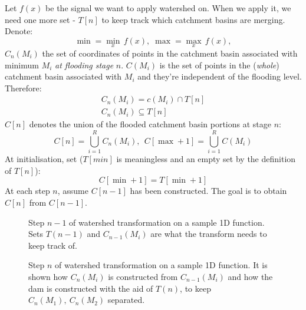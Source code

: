 \documentclass[a4paper]{article}
\begin{document}
Let $f(x)$ be the signal we want to apply watershed on. When we apply it, we need one more set - $T[n]$ to keep track which catchment basins are merging. Denote:
\[
\min = \underset{x}{\mathop{\min }}\,f\left( x \right), \;
\max = \underset{x}{\mathop{\max }}\,f\left( x \right),
\]
 $C_n(M_i)$ the set of coordinates of points in the catchment
basin associated with minimum $M_i$ \textit{at flooding stage} $n$. $C(M_i)$ is the set of points in the (\textit{whole}) catchment basin associated with $M_i$ and they're independent of the flooding level. Therefore:
\[
\begin{gathered}
C_n(M_i) = c(M_i) \cap T[n] \\
C_n(M_i) \subseteq T[n]
\end{gathered}
\]
$C[n]$ denotes the union of the
flooded catchment basin portions at
stage $n$:
\[
C\left[ n \right]=\bigcup\limits_{i=1}^{R}{{{C}_{n}}\left( {{M}_{i}} \right)},\ \ C\left[ \max +1 \right]=\bigcup\limits_{i=1}^{R}{C\left( {{M}_{i}} \right)}
\]
At initialisation, set ($T[min]$ is meaningless and an empty set by the definition of $T[n]$):
\[
C[\min+1] = T[\min+1]
\]
At each step $n$, assume $C[n-1]$ has
been constructed. The goal is to
obtain $C[n]$ from $C[n-1]$.

\begin{multicols}{2}
    \begin{figure}[H]
    \centering
    
    \captionsetup{width=0.33\textwidth}
    \caption{Step $n-1$ of watershed transformation on a sample 1D function. Sets $T(n-1)$ and $C_{n-1}(M_i)$ are what the transform needs to keep track of.}
    \end{figure}
    
    \columnbreak
    \begin{figure}[H]
    \centering
    
    \captionsetup{width=0.33\textwidth}
    \caption{Step $n$ of watershed transformation on a sample 1D function. It is shown how $C_n(M_i)$ is constructed from $C_{n-1}(M_i)$ and how the dam is constructed with the aid of $T(n)$, to keep $C_{n}(M_1), \ C_{n}(M_2)$ separated.} 
    \end{figure}
\end{multicols}
\end{document}
